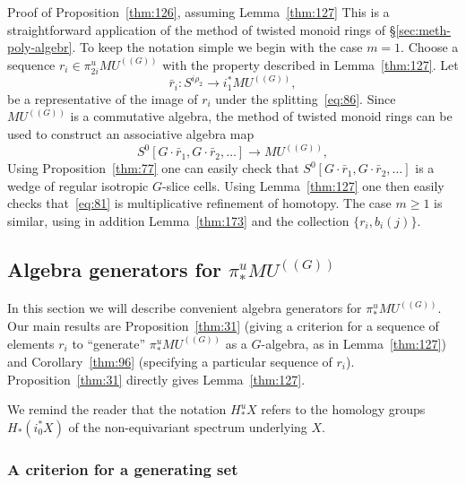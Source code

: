\documentclass{amsart}
\theoremstyle{definition}
\theoremstyle{remark}
\newenvironment{pf*}[1]{\bigskip{\em #1:\/}}{\qed\medskip}
\newcommand{\mutn}[1]{MU^{(\!(#1)\!)}}
\newcommand{\ssmutn}[1]{MU#1}
\newcommand{\piu}{\pi^{u}}
\newcommand{\hu}{H^{{u}}}
\newcommand{\gbar}{\bar}
\newcommand{\rr}{\gbar{r}}
\begin{document}
\begin{pf*}{Proof of Proposition~\ref{thm:126}, assuming
Lemma~\ref{thm:127}} This is a straightforward application of the
method of twisted monoid rings of \S\ref{sec:meth-poly-algebr}.  To
keep the notation simple we begin with the case $m=1$.  Choose a
sequence $r_{i}\in\piu_{2i}\mutn{G}$ with the property described in
Lemma~\ref{thm:127}.  Let
\begin{equation}\label{eq:79}
\rr_{i}: S^{i\rho_{2}}\to i_{1}^{\ast}\mutn{G},
\end{equation}
be a representative of the image of $r_{i}$ under the
splitting~\eqref{eq:86}.   Since $\mutn{G}$ is a commutative algebra,
the method of twisted monoid rings can be used to construct
an associative algebra map
\begin{equation}\label{eq:81}
S^{0}[G\cdot\rr_{1},G\cdot\rr_{2},\dots]\to \mutn{G},
\end{equation}
Using Proposition~\ref{thm:77} one can easily check that
$S^{0}[G\cdot\rr_{1},G\cdot\rr_{2},\dots]$ is a wedge of regular isotropic
$G$-slice cells.  Using Lemma~\ref{thm:127} one then easily checks
that~\eqref{eq:81} is multiplicative refinement of homotopy.  The case
$m\ge 1$ is similar, using in addition Lemma~\ref{thm:173} and the
collection $\{r_{i}, b_{i}(j) \}$.
\end{pf*}

\subsection{\texorpdfstring{Algebra generators for $\piu_{\ast}\mutn{G}$}{Algebra generators for $\piu_{\ast}\ssmutn{G}$}}
\label{sec:homotopy-result}

In this section we will describe convenient algebra generators for
$\piu_{\ast}\mutn{G}$.  Our main results are Proposition~\ref{thm:31}
(giving a criterion for a sequence of elements $r_{i}$ to ``generate''
$\piu_{\ast}\mutn{G}$ as a $G$-algebra, as in Lemma~\ref{thm:127}) and
Corollary~\ref{thm:96} (specifying a particular sequence of $r_{i}$).
Proposition~\ref{thm:31} directly gives Lemma~\ref{thm:127}.

We remind the reader that the notation $\hu_{\ast}X$ refers to the
homology groups $H_{\ast}(i_{0}^{\ast}X)$ of the non-equivariant
spectrum underlying $X$.


\subsubsection{A criterion for a generating set}
\label{sec:criterion}
 
\end{document}
